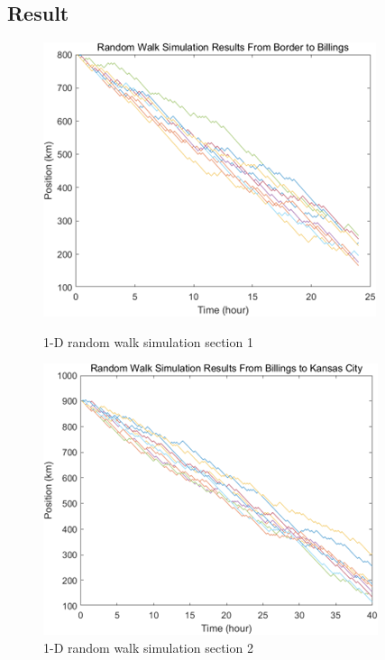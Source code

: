 \documentclass{article}
\begin{document}
\begin{multicols}{2}
\subsection{Result}
\begin{figure}[ht]
\begin{minipage}{0.45\linewidth}
\centering
\includegraphics[width=0.8\linewidth]{graph/1ds1.png} 
\caption{1-D random walk simulation section 1}
\label{1ds1}
\end{minipage}
\hfill
\begin{minipage}{0.45\linewidth}
\centering
\includegraphics[width=0.8\linewidth]{graph/1ds2.png} 
\caption{1-D random walk simulation section 2}
\label{1ds2}
\end{minipage}
\end{figure}
\begin{figure}[ht]
\begin{minipage}{0.45\linewidth}
\centering

\end{minipage}
\end{figure}
\end{multicols}
\end{document}
